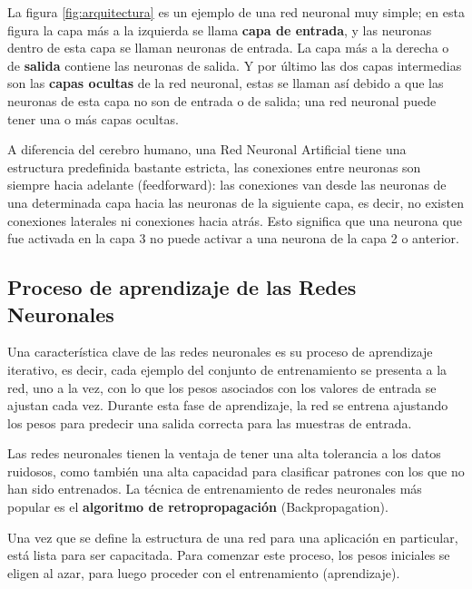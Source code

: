 La figura \ref{fig:arquitectura} es un ejemplo de una red neuronal muy simple; en esta figura la capa m\'{a}s a la izquierda se llama \textbf{capa de entrada}, y las neuronas dentro de esta capa se llaman neuronas de entrada. La capa m\'{a}s a la derecha o de \textbf{salida} contiene las neuronas de salida. Y por \'{u}ltimo las dos capas intermedias son las \textbf{capas ocultas} de la red neuronal, estas se llaman as\'{i} debido a que las neuronas de esta capa no son de entrada o de salida; una red neuronal puede tener una o m\'{a}s capas ocultas.

\vspace{5mm} %

A diferencia del cerebro humano, una Red Neuronal Artificial tiene una estructura predefinida bastante estricta, las conexiones entre neuronas son siempre hacia adelante (feedforward): las conexiones van desde las neuronas de una determinada capa hacia las neuronas de la siguiente capa, es decir, no existen conexiones laterales ni conexiones hacia atr\'{a}s. Esto significa que una neurona que fue activada en la capa 3 no puede activar a una neurona de la capa 2 o anterior.

\subsection{Proceso de aprendizaje de las Redes Neuronales}

Una caracter\'{i}stica clave de las  redes neuronales es su proceso de aprendizaje iterativo, es decir, cada ejemplo del conjunto de entrenamiento se presenta a la red, uno a la vez, con lo que los pesos asociados con los valores de entrada se ajustan cada vez. Durante esta fase de aprendizaje, la red se entrena ajustando los pesos para predecir una salida correcta para las muestras de entrada.

\vspace{5mm} %

Las redes neuronales tienen la ventaja de tener una alta tolerancia a los datos ruidosos, como tambi\'{e}n una alta capacidad para clasificar patrones con los que no han sido entrenados. La t\'{e}cnica de entrenamiento de redes neuronales m\'{a}s popular es el \textbf{algoritmo de retropropagaci\'{o}n} (Backpropagation). 

\vspace{5mm} %

Una vez que se define la estructura de una red para una aplicaci\'{o}n en particular, est\'{a} lista para ser capacitada. Para comenzar este proceso, los pesos iniciales se eligen al azar, para luego proceder con el entrenamiento (aprendizaje). 

